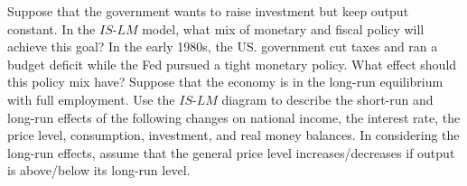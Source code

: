 \documentclass[12pt,a4paper]{exam}
\begin{document}
\begin{questions}
	\question Suppose that the government wants to raise investment
			but keep output constant. In the $IS$-$LM$ model, what mix of
			monetary and fiscal policy will achieve this goal?
			In the early 1980s, the US. government cut taxes and ran a
			budget deficit while the Fed pursued a tight monetary policy.
			What effect should this policy mix have?
	\question Suppose that the economy is in the long-run equilibrium with full
			employment. Use the $IS$-$LM$ diagram to describe the short-run and
			long-run effects of the following changes on national income, the interest
			rate, the price level, consumption, investment, and real money balances.
			In considering the long-run effects, assume that the general price
			level increases/decreases if output is above/below its long-run
			level.
\end{questions}
\end{document}
